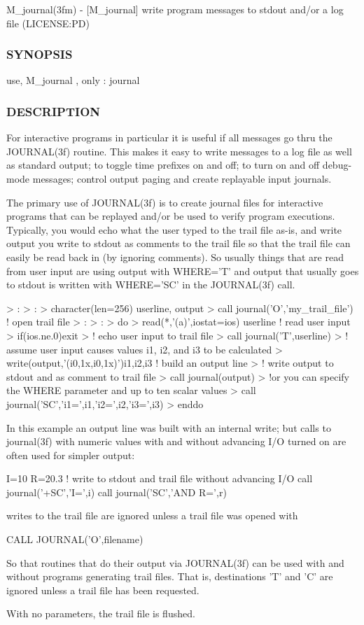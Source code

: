 M\+\_\+journal(3fm) -\/ \mbox{[}M\+\_\+journal\mbox{]} write program messages to stdout and/or a log file (L\+I\+C\+E\+N\+SE\+:PD) \subsubsection*{S\+Y\+N\+O\+P\+S\+IS}

use, M\+\_\+journal , only \+: journal \subsubsection*{D\+E\+S\+C\+R\+I\+P\+T\+I\+ON}

\begin{DoxyVerb}For interactive programs in particular it is useful if all messages
go thru the JOURNAL(3f) routine. This makes it easy to write messages
to a log file as well as standard output; to toggle time prefixes
on and off; to turn on and off debug-mode messages; control output
paging and create replayable input journals.

The primary use of JOURNAL(3f) is to create journal files for
interactive programs that can be replayed and/or be used to verify
program executions. Typically, you would echo what the user typed to
the trail file as-is, and write output you write to stdout as comments
to the trail file so that the trail file can easily be read back in
(by ignoring comments). So usually things that are read from user
input are using output with WHERE='T' and output that usually goes
to stdout is written with WHERE='SC' in the JOURNAL(3f) call.

 >      :
 >      :
 > character(len=256) userline, output
 > call journal('O','my_trail_file')  ! open trail file
 >      :
 >      :
 > do
 >    read(*,'(a)',iostat=ios) userline  ! read user input
 >    if(ios.ne.0)exit
 >    ! echo user input to trail file
 >    call journal('T',userline)
 >    ! assume user input causes values i1, i2, and i3 to be calculated
 >    write(output,'(i0,1x,i0,1x)')i1,i2,i3 ! build an output line
 >    ! write output to stdout and as comment to trail file
 >    call journal(output)
 >    !or you can specify the WHERE parameter and up to ten scalar values
 >    call journal('SC','i1=',i1,'i2=',i2,'i3=',i3)
 > enddo

In this example an output line was built with an internal write; but calls
to journal(3f) with numeric values with and without advancing I/O turned on
are often used for simpler output:

   I=10
   R=20.3
   ! write to stdout and trail file without advancing I/O
   call journal('+SC','I=',i)
   call journal('SC','AND R=',r)

writes to the trail file are ignored unless a trail file was opened with

   CALL JOURNAL('O',filename)


So that routines that do their output via JOURNAL(3f) can be used with and
without programs generating trail files. That is, destinations 'T' and 'C'
are ignored unless a trail file has been requested.

With no parameters, the trail file is flushed.
\end{DoxyVerb}



